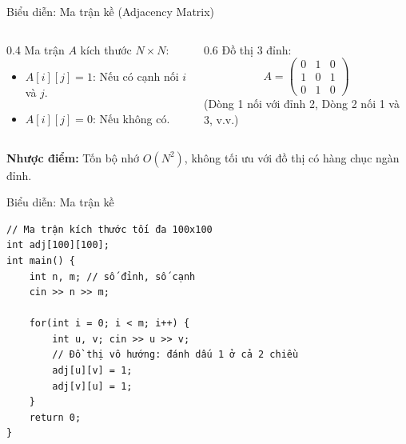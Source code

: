 \documentclass{beamer}
\begin{document}
\begin{frame}{Biểu diễn: Ma trận kề (Adjacency Matrix)}
    \begin{columns}
        \begin{column}{0.4\textwidth}
            Ma trận $A$ kích thước $N \times N$:
            \begin{itemize}
                \item $A[i][j] = 1$: Nếu có cạnh nối $i$ và $j$.
                \item $A[i][j] = 0$: Nếu không có.
            \end{itemize}
        \end{column}
        \begin{column}{0.6\textwidth}
            \centering
            Đồ thị 3 đỉnh:
            \[
            A = \begin{pmatrix} 0 & 1 & 0 \\ 1 & 0 & 1 \\ 0 & 1 & 0 \end{pmatrix}
            \]
            \small (Dòng 1 nối với đỉnh 2, Dòng 2 nối 1 và 3, v.v.)
        \end{column}
    \end{columns}
    \textbf{Nhược điểm:} Tốn bộ nhớ $O(N^2)$, không tối ưu với đồ thị có hàng chục ngàn đỉnh.
\end{frame}

\begin{frame}[fragile]{Biểu diễn: Ma trận kề}
    \begin{verbatim}
// Ma trận kích thước tối đa 100x100
int adj[100][100]; 
int main() {
    int n, m; // số đỉnh, số cạnh
    cin >> n >> m;
    
    for(int i = 0; i < m; i++) {
        int u, v; cin >> u >> v;
        // Đồ thị vô hướng: đánh dấu 1 ở cả 2 chiều
        adj[u][v] = 1;
        adj[v][u] = 1;
    }
    return 0;
}
    \end{verbatim}
\end{frame}
\end{document}
